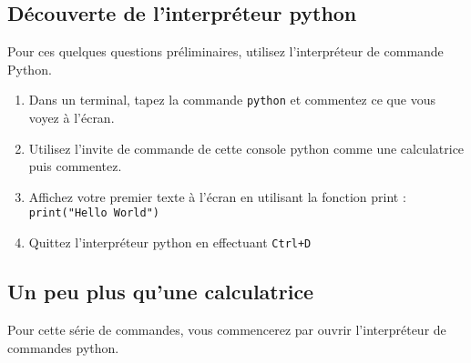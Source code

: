 
\subsection{Découverte de l'interpréteur python}

Pour ces quelques questions  préliminaires, utilisez l'interpréteur de
commande Python.

\begin{enumerate}

\item Dans un terminal, tapez la commande \texttt{python} et commentez
  ce que vous voyez à l'écran.

\item Utilisez l'invite de commande  de cette console python comme une
  calculatrice puis commentez.

\item Affichez votre premier texte  à l'écran en utilisant la fonction
  print : \\ \texttt{print("Hello World")}

\item Quittez l'interpréteur python en effectuant \texttt{Ctrl+D}

\end{enumerate}


\subsection{Un peu plus qu'une calculatrice}

Pour   cette  série   de   commandes,  vous   commencerez  par   ouvrir
l'interpréteur de commandes python.


